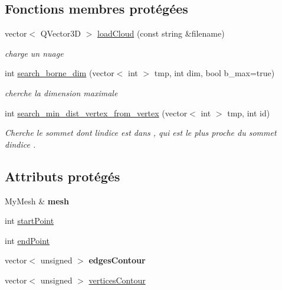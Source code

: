 \subsection*{Fonctions membres protégées}
\begin{DoxyCompactItemize}
\item 
vector$<$ Q\+Vector3D $>$ \hyperlink{classContour_a8e7d2f787365f5b4e03c3d7173f2c3e9}{load\+Cloud} (const string \&filename)
\begin{DoxyCompactList}\small\item\em charge un nuage \end{DoxyCompactList}\item 
int \hyperlink{classContour_a7c98ec3dde7850d673a63e2f6cddcb45}{search\+\_\+borne\+\_\+dim} (vector$<$ int $>$ tmp, int dim, bool b\+\_\+max=true)
\begin{DoxyCompactList}\small\item\em cherche la dimension maximale \end{DoxyCompactList}\item 
int \hyperlink{classContour_aaf1e67f8e917e3fc50620f8d91aba100}{search\+\_\+min\+\_\+dist\+\_\+vertex\+\_\+from\+\_\+vertex} (vector$<$ int $>$ tmp, int id)
\begin{DoxyCompactList}\small\item\em Cherche le sommet dont l\textquotesingle{}indice est dans , qui est le plus proche du sommet d\textquotesingle{}indice . \end{DoxyCompactList}\end{DoxyCompactItemize}
\subsection*{Attributs protégés}
\begin{DoxyCompactItemize}
\item 
\mbox{\label{classContour_ae5c4cfe642e40495f839b061800f2e62}} 
My\+Mesh \& {\bfseries mesh}
\item 
int \hyperlink{classContour_a2f694889bf420b8fabd7ecc2fbd7608d}{start\+Point}
\item 
int \hyperlink{classContour_a56a02a0bc526980bbfdcec9805ae8a86}{end\+Point}
\item 
\mbox{\label{classContour_ae8fc2f3205cabb7cd86cb9d707ef9151}} 
vector$<$ unsigned $>$ {\bfseries edges\+Contour}
\item 
vector$<$ unsigned $>$ \hyperlink{classContour_a5e1351483caaec2b0b23287a012fbc56}{vertices\+Contour}
\end{DoxyCompactItemize}


